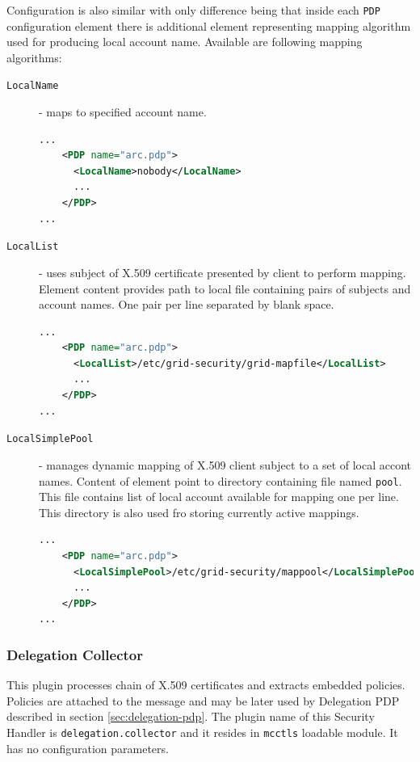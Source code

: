 \documentclass{article}
\begin{document}
Configuration is also similar with only difference being that inside
each \texttt{PDP} configuration element there is additional element
representing mapping algorithm used for producing local account name.
Available are following mapping algorithms:
\begin{description}
\item[\texttt{LocalName}] - maps to specified account name.
\begin{lstlisting}[language=xml]
...
    <PDP name="arc.pdp">
      <LocalName>nobody</LocalName>
      ...
    </PDP>
...
\end{lstlisting}

\item[\texttt{LocalList}] - uses subject of X.509 certificate presented by client
to perform mapping. Element content provides path to local file containing pairs
of subjects and account names. One pair per line separated by blank space.
\begin{lstlisting}[language=xml]
...
    <PDP name="arc.pdp">
      <LocalList>/etc/grid-security/grid-mapfile</LocalList>
      ...
    </PDP>
...
\end{lstlisting}

\item[\texttt{LocalSimplePool}] - manages dynamic mapping of X.509 client subject
to a set of local accont names. Content of element point to directory containing
file named \texttt{pool}. This file contains list of local account available for
mapping one per line. This directory is also used fro storing currently active
mappings.
\begin{lstlisting}[language=xml]
...
    <PDP name="arc.pdp">
      <LocalSimplePool>/etc/grid-security/mappool</LocalSimplePool>
      ...
    </PDP>
...
\end{lstlisting}
\end{description}

\subsubsection{Delegation Collector}\label{sec:delegcollector-shc}
This plugin processes chain of X.509 certificates and extracts embedded
policies. Policies are attached to the message and may be later used by
Delegation PDP described in section \ref{sec:delegation-pdp}. The
plugin name of this Security Handler is \texttt{delegation.collector}
and it resides in \texttt{mcctls} loadable module.
It has no configuration parameters.

\end{document}
